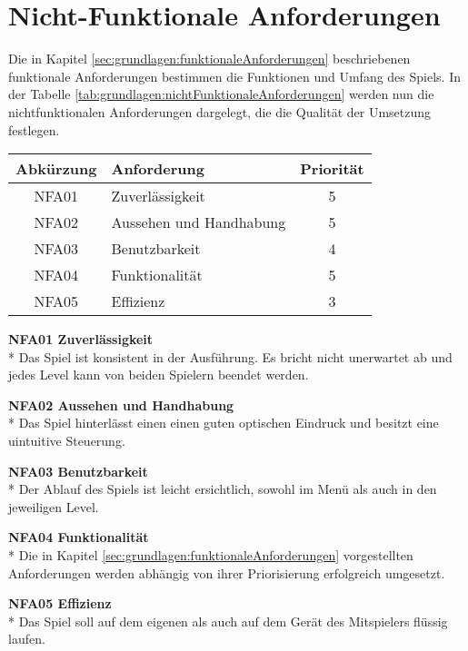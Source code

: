 \section{Nicht-Funktionale Anforderungen}
\label{sec:grundlagen:nichtFunktionaleAnforderungen}
Die in Kapitel \ref{sec:grundlagen:funktionaleAnforderungen} beschriebenen funktionale Anforderungen bestimmen die Funktionen und Umfang des Spiels. In der Tabelle \ref{tab:grundlagen:nichtFunktionaleAnforderungen} werden nun die nichtfunktionalen Anforderungen dargelegt, die die Qualität der Umsetzung festlegen.

\begin{center}
    \label{tab:grundlagen:nichtFunktionaleAnforderungen}
    \begin{tabular}{ c | l | c}
        Abkürzung & Anforderung & Priorität\\
        \hline
        NFA01 & Zuverlässigkeit & 5 \\
        \hline
        NFA02 & Aussehen und Handhabung & 5 \\
        \hline
        NFA03 & Benutzbarkeit & 4 \\
        \hline
        NFA04 & Funktionalität & 5 \\
        \hline
        NFA05 & Effizienz & 3 \\
    \end{tabular}
\end{center}

\textbf{NFA01 Zuverlässigkeit}\\*
Das Spiel ist konsistent in der Ausführung. Es bricht nicht unerwartet ab und jedes Level kann von beiden Spielern beendet werden.

\textbf{NFA02 Aussehen und Handhabung}\\*
Das Spiel hinterlässt einen einen guten optischen Eindruck und besitzt eine uintuitive Steuerung.

\textbf{NFA03 Benutzbarkeit}\\*
Der Ablauf des Spiels ist leicht ersichtlich, sowohl im Menü als auch in den jeweiligen Level.

\textbf{NFA04 Funktionalität}\\*
Die in Kapitel \ref{sec:grundlagen:funktionaleAnforderungen} vorgestellten Anforderungen werden abhängig von ihrer Priorisierung erfolgreich umgesetzt.

\textbf{NFA05 Effizienz}\\*
Das Spiel soll auf dem eigenen als auch auf dem Gerät des Mitspielers flüssig laufen. 



